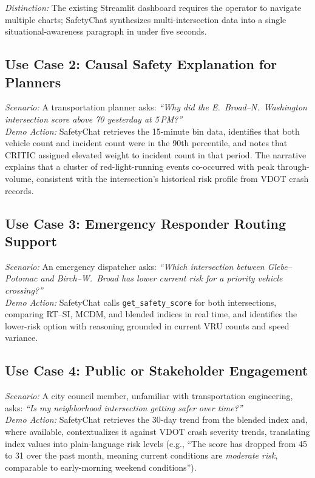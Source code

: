 \documentclass[conference]{IEEEtran}
\begin{document}
\textit{Distinction:} The existing Streamlit dashboard requires the operator to
navigate multiple charts; SafetyChat synthesizes multi-intersection data into a
single situational-awareness paragraph in under five seconds.

\subsection{Use Case 2: Causal Safety Explanation for Planners}

\textit{Scenario:} A transportation planner asks: \emph{``Why did the
E.~Broad--N.~Washington intersection score above 70 yesterday at 5\,PM?''} \\
\textit{Demo Action:} SafetyChat retrieves the 15-minute bin data, identifies that
both vehicle count and incident count were in the 90th percentile, and notes that
CRITIC assigned elevated weight to incident count in that period. The narrative
explains that a cluster of red-light-running events co-occurred with peak through-volume,
consistent with the intersection's historical risk profile from VDOT crash records.

\subsection{Use Case 3: Emergency Responder Routing Support}

\textit{Scenario:} An emergency dispatcher asks: \emph{``Which intersection between
Glebe--Potomac and Birch--W.~Broad has lower current risk for a priority vehicle
crossing?''} \\
\textit{Demo Action:} SafetyChat calls \texttt{get\_safety\_score} for both
intersections, comparing RT--SI, MCDM, and blended indices in real time, and identifies
the lower-risk option with reasoning grounded in current VRU counts and speed variance.

\subsection{Use Case 4: Public or Stakeholder Engagement}

\textit{Scenario:} A city council member, unfamiliar with transportation engineering,
asks: \emph{``Is my neighborhood intersection getting safer over time?''} \\
\textit{Demo Action:} SafetyChat retrieves the 30-day trend from the blended index
and, where available, contextualizes it against VDOT crash severity trends, translating
index values into plain-language risk levels (e.g., ``The score has dropped from 45 to
31 over the past month, meaning current conditions are \emph{moderate risk},
comparable to early-morning weekend conditions'').
\end{document}
